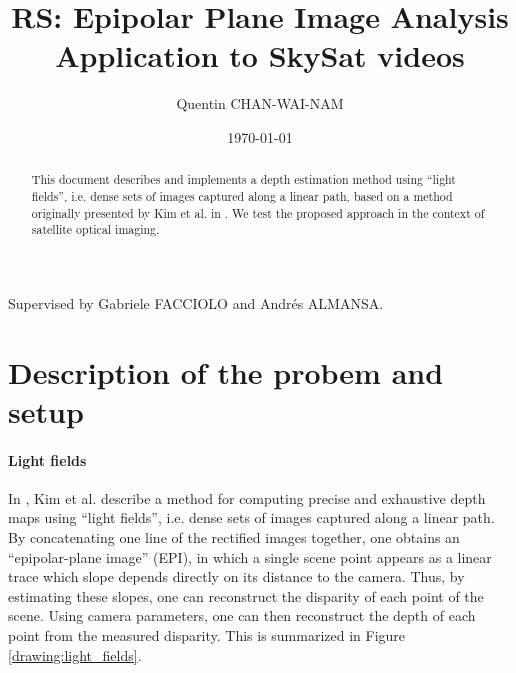 \documentclass{article}
\title{RS: Epipolar Plane Image Analysis\\Application to SkySat videos}
\date{\today}
\author{Quentin CHAN-WAI-NAM}
\theoremstyle{definition}
\begin{document}
\maketitle

\begin{center} Supervised by Gabriele FACCIOLO and Andrés ALMANSA. \end{center}

\begin{abstract}
This document describes and implements a depth estimation method using ``light fields'', i.e. dense sets of images captured along a linear path, based on a method originally presented by Kim et al. in \cite{art:kim13:lfields}. We test the proposed approach in the context of satellite optical imaging.
\end{abstract}


\tableofcontents

\clearpage
\section{Description of the probem and setup}



\paragraph{Light fields} In \cite{art:kim13:lfields}, Kim et al. describe a method for computing precise and exhaustive depth maps using ``light fields'', i.e. dense sets of images captured along a linear path. By concatenating one line of the rectified images together, one obtains an ``epipolar-plane image'' (EPI), in which a single scene point appears as a linear trace which slope depends directly on its distance to the camera. Thus, by estimating these slopes, one can reconstruct the disparity of each point of the scene. Using camera parameters, one can then reconstruct the depth of each point from the measured disparity. This is summarized in Figure \ref{drawing:light_fields}.
\end{document}
